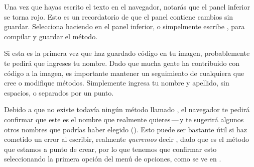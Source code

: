\documentclass[a4paper,10pt,twoside]{book}
\begin{document}
Una vez que hayas escrito el texto en el navegador, notar\'as que el panel inferior se torna rojo. Esto es un recordatorio de que el panel contiene cambios sin guardar.
Selecciona  haciendo \actclick en el panel inferior, o simpelmente escribe , para compilar y guardar el m\'etodo.

Si esta es la primera vez que haz guardado c\'odigo en tu imagen, probablemente te pedir\'a que ingreses tu nombre. Dado que mucha gente ha contribuido con c\'odigo a la imagen, es importante mantener un seguimiento de cualquiera que cree o modifique m\'etodos. Simplemente ingresa tu nombre y apellido, sin espacios, o separados por un punto.


Debido a que no existe todav\'ia ning\'un m\'etodo llamado , el navegador te pedir\'a confirmar que este es el nombre que realmente quieres\,---\,y te sugerir\'a algunos otros nombres que podr\'ias haber elegido ().
Esto puede ser bastante \'util si haz cometido un error al escribir, realmente \emph{queremos} decir , dado que es el m\'etodo que estamos a punto de crear, por lo que tenemos que confirmar esto seleccionando la primera opci\'on del men\'u de opciones, como se ve en .


\end{document}
